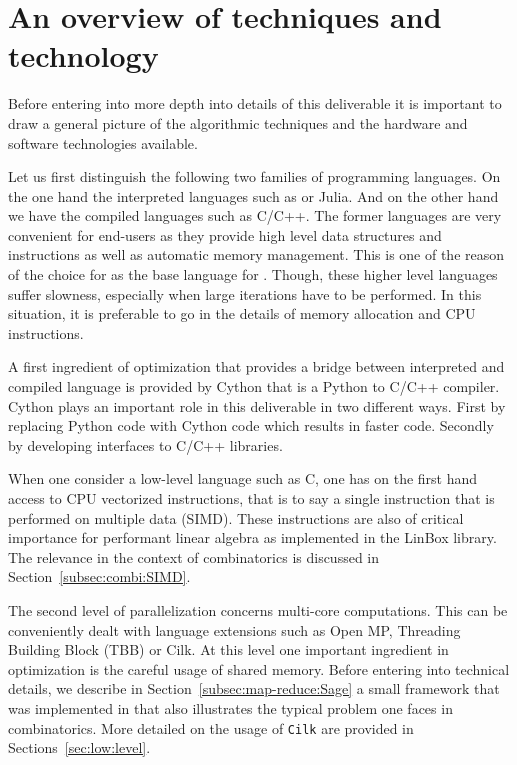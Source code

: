 \documentclass{deliverablereport}
\newcommand{\Cilk}{\texttt{Cilk}\xspace}
\begin{document}

\section{An overview of techniques and technology}

Before entering into more depth into details of this deliverable it is
important to draw a general picture of the algorithmic techniques
and the hardware and software technologies available.

Let us first distinguish the following two families of programming
languages. On the one hand the interpreted languages
such as \Python or Julia. And on the other hand we have the compiled languages
such as C/C++. The former languages are very convenient for end-users as
they provide high level data structures and instructions as well as automatic
memory management. This is one of the reason of the choice for \Python as the
base language for \Sage. Though, these higher level languages suffer slowness,
especially when large iterations have to be performed. In this situation, it is
preferable to go in the details of memory allocation and CPU instructions.

A first ingredient of optimization that provides a bridge between interpreted
and compiled language is provided by Cython that is a Python
to C/C++ compiler. Cython plays an important role in this deliverable in two
different ways. First by replacing Python code with Cython code which results
in faster code. Secondly by developing interfaces to C/C++ libraries.

When one consider a low-level language such as C, one has on the first hand
access to CPU vectorized instructions, that is to say a single instruction that
is performed on multiple data (SIMD). These
instructions are also of critical importance for performant linear
algebra as implemented in the LinBox library. The relevance in the context
of combinatorics is discussed in Section~\ref{subsec:combi:SIMD}.

The second level of parallelization concerns multi-core computations. This can
be conveniently dealt with language extensions such as Open MP,
Threading Building Block (TBB) or Cilk. At this level one important
ingredient in optimization is the careful usage of shared memory.
Before entering into technical details, we describe in
Section~\ref{subsec:map-reduce:Sage} a small framework that was
implemented in \Sage that also illustrates the typical problem one faces
in combinatorics. More detailed on the usage of \Cilk are provided
in Sections~\ref{sec:low:level}.
\end{document}
